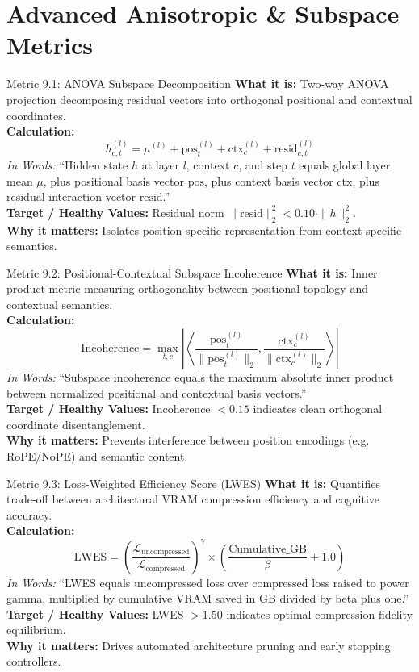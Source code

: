 \documentclass[11pt,a4paper]{article}
\begin{document}
\section{Advanced Anisotropic \& Subspace Metrics}

\begin{metricbox}{Metric 9.1: ANOVA Subspace Decomposition}
\textbf{What it is:} Two-way ANOVA projection decomposing residual vectors into orthogonal positional and contextual coordinates.\\
\textbf{Calculation:}
 $$h_{c,t}^{(l)} = \mu^{(l)} + \text{pos}_t^{(l)} + \text{ctx}_c^{(l)} + \text{resid}_{c,t}^{(l)}$$ \emph{In Words:} ``Hidden state $h$ at layer $l$, context $c$, and step $t$ equals global layer mean $\mu$, plus positional basis vector $\text{pos}$, plus context basis vector $\text{ctx}$, plus residual interaction vector $\text{resid}$.''\\
\textbf{Target / Healthy Values:} Residual norm $\|\text{resid}\|_2^2 < 0.10 \cdot \|h\|_2^2$.\\
\textbf{Why it matters:} Isolates position-specific representation from context-specific semantics.
\end{metricbox}

\begin{metricbox}{Metric 9.2: Positional-Contextual Subspace Incoherence}
\textbf{What it is:} Inner product metric measuring orthogonality between positional topology and contextual semantics.\\
\textbf{Calculation:}
 $$\text{Incoherence} = \max_{t, c} \left|\left\langle \frac{\text{pos}_t^{(l)}}{\|\text{pos}_t^{(l)}\|_2}, \frac{\text{ctx}_c^{(l)}}{\|\text{ctx}_c^{(l)}\|_2} \right\rangle\right|$$ \emph{In Words:} ``Subspace incoherence equals the maximum absolute inner product between normalized positional and contextual basis vectors.''\\
\textbf{Target / Healthy Values:} Incoherence $< 0.15$ indicates clean orthogonal coordinate disentanglement.\\
\textbf{Why it matters:} Prevents interference between position encodings (e.g. RoPE/NoPE) and semantic content.
\end{metricbox}

\begin{metricbox}{Metric 9.3: Loss-Weighted Efficiency Score (LWES)}
\textbf{What it is:} Quantifies trade-off between architectural VRAM compression efficiency and cognitive accuracy.\\
\textbf{Calculation:}
 $$\text{LWES} = \left(\frac{\mathcal{L}_{\text{uncompressed}}}{\mathcal{L}_{\text{compressed}}}\right)^\gamma \times \left(\frac{\text{Cumulative\_GB}}{\beta} + 1.0\right)$$ \emph{In Words:} ``LWES equals uncompressed loss over compressed loss raised to power gamma, multiplied by cumulative VRAM saved in GB divided by beta plus one.''\\
\textbf{Target / Healthy Values:} LWES $> 1.50$ indicates optimal compression-fidelity equilibrium.\\
\textbf{Why it matters:} Drives automated architecture pruning and early stopping controllers.
\end{metricbox}
\end{document}
